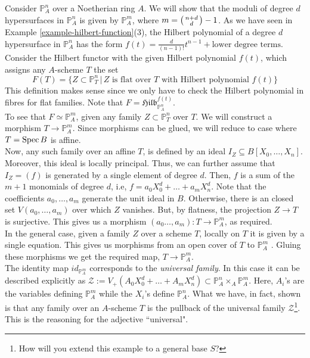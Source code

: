 \documentclass[ignorenonframetext,t]{beamer}
\newcommand{\Spec}{{\rm Spec \,}}
\newcommand{\sZ}{{\mathcal Z}}
\renewcommand{\P}{{\mathbb P}}
\theoremstyle{definition}
\begin{document}
\begin{example}
	Consider $\P^n_A$ over a Noetherian ring $A$. We will show that the moduli of degree $d$ hypersurfaces in $\P^n_A$ is given by $\P^m_A$, where 
	$m = \begin{psmallmatrix}
	n + d\\
	d
	\end{psmallmatrix} -1$. As we have seen in Example \ref{example-hilbert-function}(3), the Hilbert polynomial of a degree $d$ hypersurface in $\P^n_A$ has the form $f(t)=\frac{d}{(n-1)!}t^{n-1}+\text{lower degree terms}$. Consider the Hilbert functor with the given Hilbert polynomial $f(t)$, which assigns any $A$-scheme $T$ the set
	\begin{equation*}
	F(T)=\{ Z\subset \P^n_T \, | \, \text{$Z$ is flat over $T$ with Hilbert polynomial $f(t)$}\}
	\end{equation*}
	This definition makes sense since we only have to check the Hilbert polynomial in fibres for flat families. Note that $F=\mathfrak{Hilb}^{f(t)}_{\P^n_A}$.\\
	To see that $F\simeq \P^m_A$, given any family $Z\subset \P^n_T$ over $T$. We will construct a morphism $T\rightarrow\P^m_A$. Since morphisms can be glued, we will reduce to case where $T=\Spec B$ is affine.\\
	Now, any such family over an affine $T$, is defined by an ideal $I_Z\subseteq B[X_0,\ldots,X_n]$. Moreover, this ideal is locally principal. Thus, we can further assume that $I_Z = (f)$ is generated by a single element of degree $d$. Then, $f$ is a sum of the $m+1$ monomials of degree $d$, i.e, $f=a_0 X^d_0+\ldots+a_m X^d_n$. Note that the coefficients $a_0,\ldots,a_m$ generate the unit ideal in $B$. Otherwise, there is an closed set $V(a_0,\ldots,a_m)$ over which $Z$ vanishes. But, by flatness, the projection $Z\rightarrow T$ is surjective. This gives us a morphism $(a_0\ldots,a_m): T\rightarrow \P^m_A$, as required.\\
	In the general case, given a family $Z$ over a scheme $T$, locally on $T$ it is given by a single equation. This gives us morphisms from an open cover of $T$ to $\P^m_A$ . Gluing these morphisms we get the required map, $T\rightarrow \P^m_A$.\\
	The identity map $id_{\P^m_A}$ corresponds to the \textit{universal family}. In this case it can be described explicitly as $\sZ:=V_+(A_0 X_0^d+\ldots + A_m X_n^d)\subset \P^n_A\times_A \P^m_A$. Here, $A_i$'s are the variables defining $\P^m_A$ while the $X_i$'s define $\P^n_A$. What we have, in fact, shown is that any family over an $A$-scheme $T$ is the pullback of the universal family $\sZ$\footnote{How will you extend this example to a general base $S$?}. This is the reasoning for the adjective ``universal".
\end{example}
\end{document}
